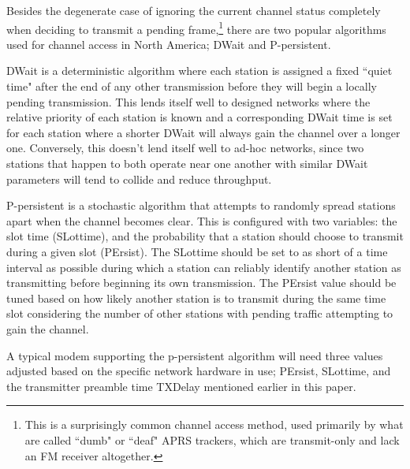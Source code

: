 \documentclass[12pt,letterpaper]{article}
\begin{document}
Besides the degenerate case of ignoring the current channel status completely when 
deciding to transmit a pending frame,\footnote{This is a surprisingly
	common channel access method, used primarily by what are called ``dumb" or
	``deaf" APRS trackers, which are transmit-only and lack an
FM receiver altogether.}
there are two popular algorithms used for
channel access in North America;
DWait and P-persistent.

DWait is a deterministic algorithm where each station is assigned a fixed
``quiet time" after the end of any other transmission 
before they will begin a locally pending transmission. 
This lends itself well to designed networks
where the relative priority of each station is known and a corresponding DWait time
is set for each station where a shorter DWait will 
always gain the channel over a longer one. 
Conversely, this doesn't lend itself well to ad-hoc networks,
since two stations that happen to both operate near one another 
with similar DWait parameters
will tend to collide and reduce throughput.

P-persistent is a stochastic algorithm that attempts to randomly spread
stations apart when the channel becomes clear. 
This is configured with two variables: the slot time (SLottime), and the
probability that a station should choose to transmit during a given slot (PErsist). 
The SLottime
should be set to as short of a time interval as possible during which a station can
reliably identify another station as transmitting 
before beginning its own transmission.
The PErsist value should be tuned based on how likely another station is to transmit 
during the same time slot considering the number of other stations with 
pending traffic attempting to gain the channel.

A typical modem supporting the p-persistent algorithm will need three values adjusted
based on the specific network hardware in use; PErsist, SLottime, and the 
transmitter preamble time TXDelay mentioned earlier in this paper.
\end{document}
